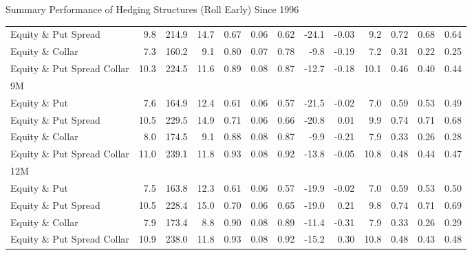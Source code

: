 \documentclass{beamer}
\begin{document}
\begin{frame}{\normalsize Summary Performance of Hedging Structures (Roll Early) Since 1996}
{\begin{tabular}{lrrrrrrrrrrrr}
Equity \& Put Spread & 9.8 & 214.9 & 14.7 & 0.67 & 0.06 & 0.62 & -24.1 & -0.03 & 9.2 & 0.72 & 0.68 & 0.64\\
Equity \& Collar & 7.3 & 160.2 & 9.1 & 0.80 & 0.07 & 0.78 & -9.8 & -0.19 & 7.2 & 0.31 & 0.22 & 0.25\\
Equity \& Put Spread Collar & 10.3 & 224.5 & 11.6 & 0.89 & 0.08 & 0.87 & -12.7 & -0.18 & 10.1 & 0.46 & 0.40 & 0.44\\
\midrule
9M \\
\midrule
Equity \& Put & 7.6 & 164.9 & 12.4 & 0.61 & 0.06 & 0.57 & -21.5 & -0.02 & 7.0 & 0.59 & 0.53 & 0.49\\
Equity \& Put Spread & 10.5 & 229.5 & 14.9 & 0.71 & 0.06 & 0.66 & -20.8 & 0.01 & 9.9 & 0.74 & 0.71 & 0.68\\
Equity \& Collar & 8.0 & 174.5 & 9.1 & 0.88 & 0.08 & 0.87 & -9.9 & -0.21 & 7.9 & 0.33 & 0.26 & 0.28\\
Equity \& Put Spread Collar & 11.0 & 239.1 & 11.8 & 0.93 & 0.08 & 0.92 & -13.8 & -0.05 & 10.8 & 0.48 & 0.44 & 0.47\\
\midrule
12M \\
\midrule
Equity \& Put & 7.5 & 163.8 & 12.3 & 0.61 & 0.06 & 0.57 & -19.9 & -0.02 & 7.0 & 0.59 & 0.53 & 0.50\\
Equity \& Put Spread & 10.5 & 228.4 & 15.0 & 0.70 & 0.06 & 0.65 & -19.0 & 0.21 & 9.8 & 0.74 & 0.71 & 0.69\\
Equity \& Collar & 7.9 & 173.4 & 8.8 & 0.90 & 0.08 & 0.89 & -11.4 & -0.31 & 7.9 & 0.33 & 0.26 & 0.29\\
Equity \& Put Spread Collar & 10.9 & 238.0 & 11.8 & 0.93 & 0.08 & 0.92 & -15.2 & 0.30 & 10.8 & 0.48 & 0.43 & 0.48\\
\bottomrule
\end{tabular}
}
\end{frame}
\end{document}
